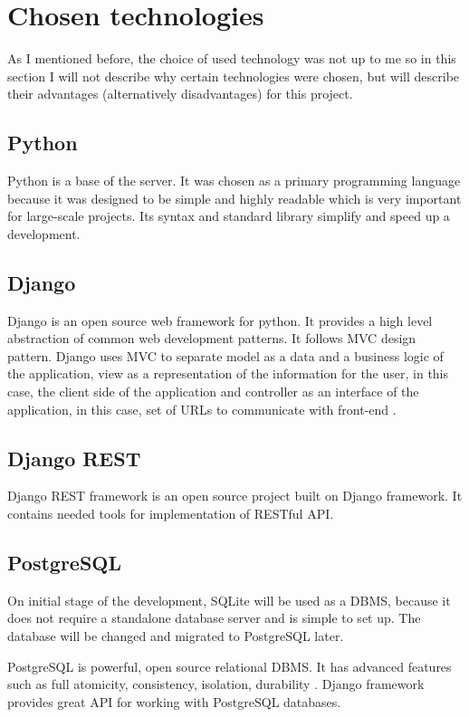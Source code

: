 \section{Chosen technologies}
As I mentioned before, the choice of used technology was not up to me so in this section I will not describe why
certain technologies were chosen, but will describe their advantages (alternatively disadvantages) for this project.


\subsection{Python}
Python is a base of the server. It was chosen as a primary programming language because it was designed to be simple
and highly readable which is very important for large-scale projects. Its syntax and standard library simplify and
speed up a development.

\subsection{Django}
Django is an open source web framework for python. It provides a high level abstraction of common web development
patterns. It follows \ac{MVC} design pattern. Django uses \ac{MVC} to separate model as a data and a business logic of
the application, view as a representation of the information for the user, in this case, the client side of the
application and controller as an interface of the application, in this case, set of URLs to communicate with
front-end \cite{django}.

\subsection{Django REST}
Django REST framework is an open source project built on Django framework. It contains needed tools for implementation
of \ac{REST}ful \ac{API}.

\subsection{PostgreSQL}
On initial stage of the development, SQLite will be used as a \ac{DBMS}, because it does not require a standalone
database server and is simple to set up. The database will be changed and migrated to PostgreSQL later.

PostgreSQL is powerful, open source relational \ac{DBMS}. It has advanced features such as full
atomicity, consistency, isolation, durability \cite{postgres}. Django framework provides great \ac{API} for working
with PostgreSQL databases.

